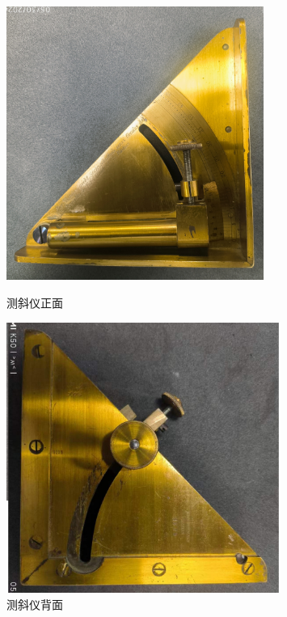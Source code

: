 \documentclass[UTF8]{ctexart}
\begin{document}
\begin{figure}[h]
    \centering
    \begin{minipage}[t]{0.38\textwidth}
        \centering
        \includegraphics[width=0.75\textwidth]{img/clinometer_surface_face.jpg}
        \caption{测斜仪正面}
    \label{fig:clinometer_surface_face}
    \end{minipage}
    \begin{minipage}[t]{0.38\textwidth}
        \centering
        \includegraphics[width=0.8\textwidth]{img/clinometer_surface_back.jpg}
        \caption{测斜仪背面}
    \label{fig:clinometer_surface_back}
    \end{minipage}

\end{figure}
\end{document}
